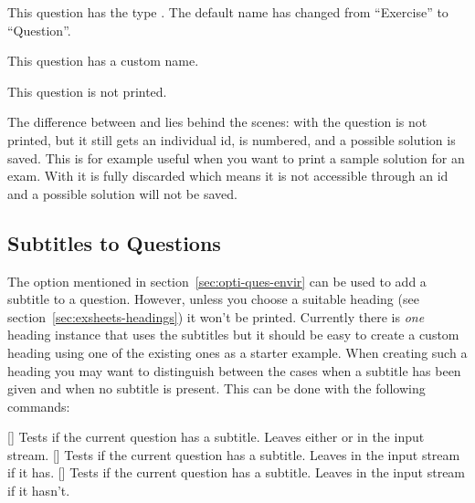 \documentclass[load-preamble+]{cnltx-doc}
\begin{document}
\begin{example}
  \begin{question}[type=exam]
    This question has the type . The default name has changed
    from ``Exercise'' to ``Question''.
  \end{question}
  \begin{question}[name=Fancy name]
    This question has a custom name.
  \end{question}
  \begin{question}[print=false]
    This question is not printed.
  \end{question}
\end{example}

The difference between  and  lies behind the scenes:
with  the question is not printed, but it still gets an
individual \ac{id}, is numbered, and a possible solution is saved.  This is
for example useful when you want to print a sample solution for an exam.  With
 it is fully discarded which means it is not accessible
through an \acs{id} and a possible solution will not be saved.

\subsection{Subtitles to Questions}\label{sec:subtitles-questions}
The  option mentioned in section~\ref{sec:opti-ques-envir}
can be used to add a subtitle to a question.  However, unless you choose a
suitable heading (see section~\ref{sec:exsheets-headings}) it won't be
printed.  Currently there is \emph{one} heading instance that uses the
subtitles but it should be easy to create a custom heading using one of the
existing ones as a starter example.  When creating such a heading you may want
to distinguish between the cases when a subtitle has been given and when no
subtitle is present.  This can be done with the following commands:
\begin{commands}
  \expandable{}[]
    Tests if the current question has a subtitle.  Leaves either  or  in the input stream.
  \expandable{}[]
    Tests if the current question has a subtitle.  Leaves  in
    the input stream if it has.
  \expandable{}[]
    Tests if the current question has a subtitle.  Leaves  in
    the input stream if it hasn't.
\end{commands}
\end{document}
